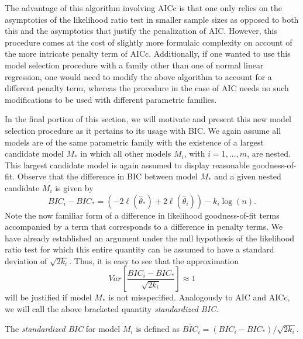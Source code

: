 		The advantage of this algorithm involving AICc is that one only relies on the asymptotics of the likelihood ratio test in smaller sample sizes as opposed
		to both this and the asymptotics that justify the penalization of AIC. However, this procedure comes at the cost of slightly more formulaic complexity on account of the more intricate
		penalty term of AICc. Additionally, if one wanted to use this model selection procedure with a family other than one of normal linear regression,
		one would need to modify the above algorithm to account for a different penalty term, whereas the procedure in the case of AIC needs no such modifications
		to be used with different parametric families.

		In the final portion of this section, we will motivate and present this new model selection procedure as it pertains to its usage with BIC. We again assume
		all models are of the same parametric family with the existence of a largest candidate model $M_*$ in which all other models $M_i$, with $i = 1,...,m$, are nested.
		This largest candidate model is again assumed to display reasonable goodness-of-fit. Observe that the difference in BIC between model $M_*$ and a given
		nested candidate $M_i$ is given by
		\begin{equation*}
			BIC_i - BIC_* = \left( -2 \ell (\hat{\theta}_*) + 2 \ell (\hat{\theta}_i) \right) - k_i \log(n) .
		\end{equation*}
		Note the now familiar form of a difference in likelihood goodness-of-fit terms accompanied by a term that corresponds to a difference in penalty terms.
		We have already established an argument under the null hypothesis of the likelihood ratio test for which this entire quantity can be assumed to have
		a standard deviation of $\sqrt{2k_i}$. Thus, it is easy to see that the approximation
		\begin{equation*}
			Var \left[ \frac{BIC_i - BIC_*}{\sqrt{2k_i}} \right] \approx 1 
		\end{equation*}
		will be justified if model $M_*$ is not misspecified. Analogously to AIC and AICc, we will call the above bracketed quantity \textit{standardized BIC}.
		\begin{definition}
			The \textit{standardized BIC} for model $M_i$ is defined as $\overline{BIC}_i = (BIC_i - BIC_*) / \sqrt{2k_i}$.
		\end{definition}

